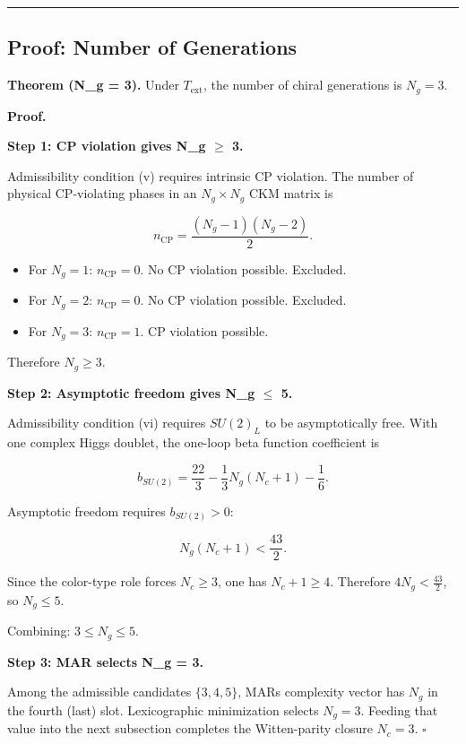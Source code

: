 \begin{center}\rule{0.5\linewidth}{0.5pt}\end{center}

\subsection{Proof: Number of Generations}\label{6-proof-number-of-generations}

\textbf{Theorem (N\_g = 3).} Under \(T_{\mathrm{ext}}\), the number of chiral generations is \(N_g = 3\).

\textbf{Proof.}

\textbf{Step 1: CP violation gives N\_g \ensuremath{\geq} 3.}

Admissibility condition (v) requires intrinsic CP violation. The number of physical CP-violating phases in an \(N_g \times N_g\) CKM matrix is

\[n_{\mathrm{CP}} = \frac{(N_g - 1)(N_g - 2)}{2}.\]

\begin{itemize}
\tightlist
\item
  For \(N_g = 1\): \(n_{\mathrm{CP}} = 0\). No CP violation possible. Excluded.
\item
  For \(N_g = 2\): \(n_{\mathrm{CP}} = 0\). No CP violation possible. Excluded.
\item
  For \(N_g = 3\): \(n_{\mathrm{CP}} = 1\). CP violation possible.
\end{itemize}

Therefore \(N_g \geq 3\).

\textbf{Step 2: Asymptotic freedom gives N\_g \ensuremath{\leq} 5.}

Admissibility condition (vi) requires \(SU(2)_L\) to be asymptotically free. With one complex Higgs doublet, the one-loop beta function coefficient is

\[b_{SU(2)} = \frac{22}{3} - \frac{1}{3}N_g(N_c + 1) - \frac{1}{6}.\]

Asymptotic freedom requires \(b_{SU(2)} > 0\):

\[N_g(N_c + 1) < \frac{43}{2}.\]

Since the color-type role forces \(N_c \ge 3\), one has \(N_c + 1 \ge 4\). Therefore \(4N_g < \frac{43}{2}\), so \(N_g \leq 5\).

Combining: \(3 \leq N_g \leq 5\).

\textbf{Step 3: MAR selects N\_g = 3.}

Among the admissible candidates \(\{3, 4, 5\}\), MAR\textquotesingle s complexity vector has \(N_g\) in the fourth (last) slot. Lexicographic minimization selects \(N_g = 3\). Feeding that value into the next subsection completes the Witten-parity closure \(N_c = 3\). \(\square\)

